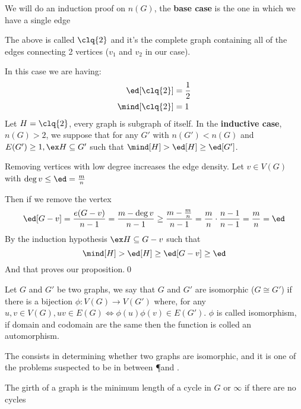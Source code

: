 \begin{prf}
    We will do an induction proof on $n(G)$, the \textbf{base case} is the one in which we have a single edge
    \begin{figure}[h]
        \centering
        
    \end{figure}
    The above is called $\clq{2}$ and it's the complete graph containing all of the edges connecting 2 vertices ($v_1$ and $v_2$ in our case).

    In this case we are having:
    \begin{align*}
        \ed[\clq{2}] &= \frac{1}{2} \\
        \mind[\clq{2}] &= 1
    \end{align*}
    Let $H = \clq{2}$, every graph is subgraph of itself.
    In the \textbf{inductive case}, $n(G) > 2$, we suppose that for any $G'$ with $n(G') < n(G)$ and $E(G') \geq 1, \ex H \subseteq G'$ such that $\mind[H] > \ed[H] \geq \ed[G']$.
    
    Removing vertices with low degree increases the edge density. Let $v \in V(G)$ with $\deg{v} \leq \ed = \frac{m}{n}$

    Then if we remove the vertex
    \begin{equation*}
        \ed[G - v] = \frac{e(G - v)}{n - 1} = \frac{m - \deg{v}}{n - 1} \geq \frac{m - \frac{m}{n}}{n - 1} = \frac{m}{n} \cdot \frac{n - 1}{n - 1} = \frac{m}{n} = \ed
    \end{equation*}
    By the induction hypothesis $\ex H \subseteq G - v$ such that
    \begin{equation*}
        \mind[H] > \ed[H] \geq \ed[G - v] \geq \ed
    \end{equation*}
    And that proves our proposition.\qed
\end{prf}
Let $G$ and $G'$ be two graphs, we say that $G$ and $G'$ are isomorphic ($G \cong G'$) if there is a bijection $\phi: V(G) \rightarrow V(G')$ where, for any $u, v \in V(G), uv \in E(G) \iff \phi(u)\phi(v) \in E(G')$. $\phi$ is called isomorphism, if domain and codomain are the same then the function is colled an automorphism.
\begin{cf}
    The  consists in determining whether two graphs are isomorphic, and it is one of the problems suspected to be in between \P and \NP.
\end{cf}
\begin{definition}[Girth]
    The girth of a graph is the minimum length of a cycle in $G$ or $\infty$ if there are no cycles
\end{definition}
